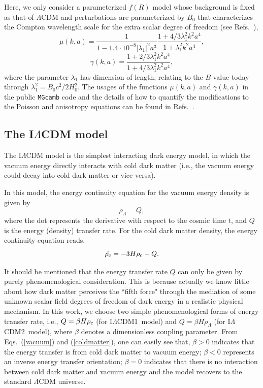 \documentclass[aps,prd,nofootinbib,amsmath,amssymb,twocolumn,superscriptaddress,10pt]{revtex4}%
\newcommand{\ILCDM}{I$\Lambda$CDM}
\begin{document}
Here, we only consider a parameterized $f(R)$ model whose background is fixed as that of $\Lambda$CDM and perturbations are parameterized by $B_0$ that characterizes the Compton wavelength scale for the extra scalar degree of freedom (see Refs.~\cite{Bertschinger:2008zb,Giannantonio:2009gi,Li:2015fR}),
\begin{equation}\label{mu}
\mu(k,a)=\frac{1}{1-1.4\cdot10^{-8}|\lambda_{1}|^{2}a^{3}}\frac{1+4/3\lambda_{1}^{2}k^{2}a^{4}}{1+\lambda_{1}^{2}k^{2}a^{4}},
\end{equation}
\begin{equation}\label{gama}
  \gamma(k,a)=\frac{1+2/3\lambda_{1}^{2}k^{2}a^{4}}{1+4/3\lambda_{1}^{2}k^{2}a^{4}},
\end{equation}
where the parameter $\lambda_{1}$ has dimension of length, relating to the $B$ value today through $\lambda_{1}^{2}=B_{0}c^{2}/2H_{0}^{2}$. The usages of the functions $\mu(k,a)$ and $\gamma(k,a)$ in the public {\tt MGcamb} code and the details of how to quantify the modifications to the Poisson and anisotropy equations can be found in Refs.~\cite{Lewis:1999bs,Hojjati:2011ix}.



\subsection{The I$\Lambda$CDM model}


{The I$\Lambda$CDM model is the simplest interacting dark energy model, in which the vacuum energy directly interacts with cold dark matter (i.e., the vacuum energy could decay into cold dark matter or vice versa).}

In this model, the energy continuity equation for the vacuum energy density is given by
\begin{equation}\label{vacuum}
  \dot{\rho_{\Lambda}}=Q,
\end{equation}
where the dot represents the derivative with respect to the cosmic time $t$, and $Q$ is the energy (density) transfer rate. For the cold dark matter density, the energy continuity equation reads,
\begin{equation}\label{coldmatter}
  \dot{\rho_{\rm c}}=-3H\rho_{\rm c}-Q.
\end{equation}

It should be mentioned that the energy transfer rate $Q$ can only be given by purely phenomenological consideration. {This is because actually we know little about how dark matter perceives the ``fifth force" through the mediation of some unknown scalar field degrees of freedom of dark energy in a realistic physical mechanism}. In this work, we choose two simple phenomenological forms of energy transfer rate, i.e., {$Q=\beta H\rho_{\rm c}$ (for \ILCDM1\ model) and $Q=\beta H\rho_{\Lambda}$ (for \ILCDM2\ model)}, where $\beta$ denotes a dimensionless coupling parameter. From Eqs.~(\ref{vacuum}) and (\ref{coldmatter}), one can easily see that, $\beta>0$ indicates that the energy transfer is from cold dark matter to vacuum energy; {$\beta<0$ represents an inverse energy transfer orientation}; $\beta=0$ indicates that there is no interaction between cold dark matter and vacuum energy and {the model recovers to the standard $\Lambda$CDM universe}.
\end{document}
